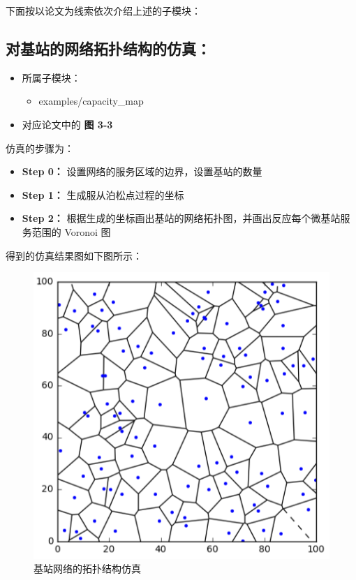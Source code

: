 \documentclass[11pt]{article}
\makeatletter
\def\maxwidth{\ifdim\Gin@nat@width>\linewidth\linewidth
    \else\Gin@nat@width\fi}
\let\Oldincludegraphics\includegraphics
\renewcommand{\includegraphics}[1]{\Oldincludegraphics[width=.8\maxwidth]{#1}}
\providecommand{\tightlist}{%
      \setlength{\itemsep}{0pt}\setlength{\parskip}{0pt}}
\makeatother
\begin{document}
下面按以论文为线索依次介绍上述的子模块：

    \subsection{对基站的网络拓扑结构的仿真：}\label{ux5bf9ux57faux7ad9ux7684ux7f51ux7edcux62d3ux6251ux7ed3ux6784ux7684ux4effux771f}

\begin{itemize}
\tightlist
\item
  所属子模块：

  \begin{itemize}
  \tightlist
  \item
    examples/capacity\_map
  \end{itemize}
\item
  对应论文中的 \textbf{图 3-3}
\end{itemize}

仿真的步骤为：

\begin{itemize}
\tightlist
\item
  \textbf{Step 0：} 设置网络的服务区域的边界，设置基站的数量
\item
  \textbf{Step 1：} 生成服从泊松点过程的坐标
\item
  \textbf{Step 2：}
  根据生成的坐标画出基站的网络拓扑图，并画出反应每个微基站服务范围的
  Voronoi 图
\end{itemize}

得到的仿真结果图如下图所示：

\begin{figure}[htbp]
\centering
\includegraphics{./bs_station.png}
\caption{基站网络的拓扑结构仿真}
\end{figure}
\end{document}
